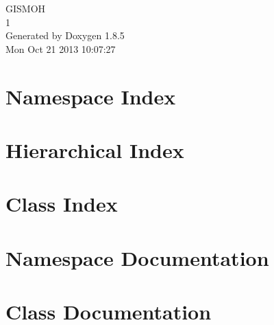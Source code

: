 \documentclass[twoside]{book}
\newcommand{\clearemptydoublepage}{%
  \newpage{\pagestyle{empty}\cleardoublepage}%
}
\begin{document}
\hypersetup{pageanchor=false}
\begin{titlepage}
\vspace*{7cm}
\begin{center}%
{\Large G\-I\-S\-M\-O\-H \\[1ex]\large 1 }\\
\vspace*{1cm}
{\large Generated by Doxygen 1.8.5}\\
\vspace*{0.5cm}
{\small Mon Oct 21 2013 10:07:27}\\
\end{center}
\end{titlepage}
\clearemptydoublepage
\tableofcontents
\clearemptydoublepage
{}
\hypersetup{pageanchor=true}

\chapter{Namespace Index}

\chapter{Hierarchical Index}

\chapter{Class Index}

\chapter{Namespace Documentation}




\chapter{Class Documentation}




















\newpage
{}
{}
\printindex
\end{document}
